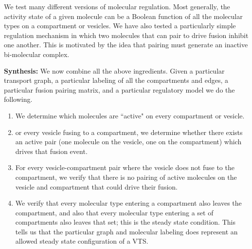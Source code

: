 We test many different versions of molecular
regulation.
%
Most generally, the activity state of a given molecule can be a
Boolean function of all the molecular types on a compartment or vesicles.
We have also tested a particularly simple regulation mechanism in which two
molecules that can pair to drive fusion inhibit one another.
%
This is motivated by the idea that pairing must generate an inactive
bi-molecular complex.

\textbf{Synthesis:} We now combine all the above ingredients.
%
Given a particular
transport graph, a particular labeling of all the compartments and edges,
a particular fusion pairing matrix, and a particular regulatory model we do
the following.
\begin{enumerate}
\item We determine which molecules are ``active" on every
compartment or vesicle.
\item or every vesicle fusing to a compartment, we
determine whether there exists an active pair (one molecule on the vesicle,
one on the compartment) which drives that fusion event.
\item For every vesicle-compartment pair where the vesicle does not fuse to the
compartment, we verify that there is no pairing of active molecules on the
vesicle and compartment that could drive their fusion.
\item We verify that every molecular type entering a compartment also leaves the compartment,
and also that every molecular type entering a set of compartments also
leaves that set; this is the steady state condition.
%
This tells us that the
particular graph and molecular labeling does represent an allowed steady
state configuration of a VTS.
\end{enumerate}

